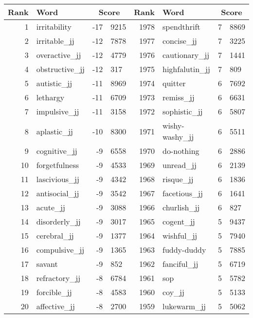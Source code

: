 \begin{table}[tbp]
    \begin{tabular}{| rlr@{.}l | rlr@{.}l |}
    \hline
    \textbf{Rank} & \textbf{Word} & \multicolumn{2}{c|}{\textbf{Score}} & \textbf{Rank} & \textbf{Word} & \multicolumn{2}{c|}{\textbf{Score}} \\
    \hline
    1 & irritability & -17 & 9215    &    1978 & spendthrift & 7 & 8869 \\
    2 & irritable\_jj & -12 & 7878    &    1977 & concise\_jj & 7 & 3225 \\
    3 & overactive\_jj & -12 & 4779    &    1976 & cautionary\_jj & 7 & 1441 \\
    4 & obstructive\_jj & -12 & 317    &    1975 & highfalutin\_jj & 7 & 809 \\
    5 & autistic\_jj & -11 & 8969    &    1974 & quitter & 6 & 7692 \\
    6 & lethargy & -11 & 6709    &    1973 & remiss\_jj & 6 & 6631 \\
    7 & impulsive\_jj & -11 & 3158    &    1972 & sophistic\_jj & 6 & 5807 \\
    8 & aplastic\_jj & -10 & 8300    &    1971 & wishy-washy\_jj & 6 & 5511 \\
    9 & cognitive\_jj & -9 & 6558    &    1970 & do-nothing & 6 & 2886 \\
    10 & forgetfulness & -9 & 4533    &    1969 & unread\_jj & 6 & 2139 \\
    11 & lascivious\_jj & -9 & 4342    &    1968 & risque\_jj & 6 & 1836 \\
    12 & antisocial\_jj & -9 & 3542    &    1967 & facetious\_jj & 6 & 1641 \\
    13 & acute\_jj & -9 & 3088    &    1966 & churlish\_jj & 6 & 827 \\
    14 & disorderly\_jj & -9 & 3017    &    1965 & cogent\_jj & 5 & 9437 \\
    15 & cerebral\_jj & -9 & 1377    &    1964 & wishful\_jj & 5 & 7940 \\
    16 & compulsive\_jj & -9 & 1365    &    1963 & fuddy-duddy & 5 & 7885 \\
    17 & savant & -9 & 852    &    1962 & fanciful\_jj & 5 & 6719 \\
    18 & refractory\_jj & -8 & 6784    &    1961 & sop & 5 & 5782 \\
    19 & forcible\_jj & -8 & 4583    &    1960 & coy\_jj & 5 & 5133 \\
    20 & affective\_jj & -8 & 2700    &    1959 & lukewarm\_jj & 5 & 5062 \\

\end{tabular}
\end{table}
